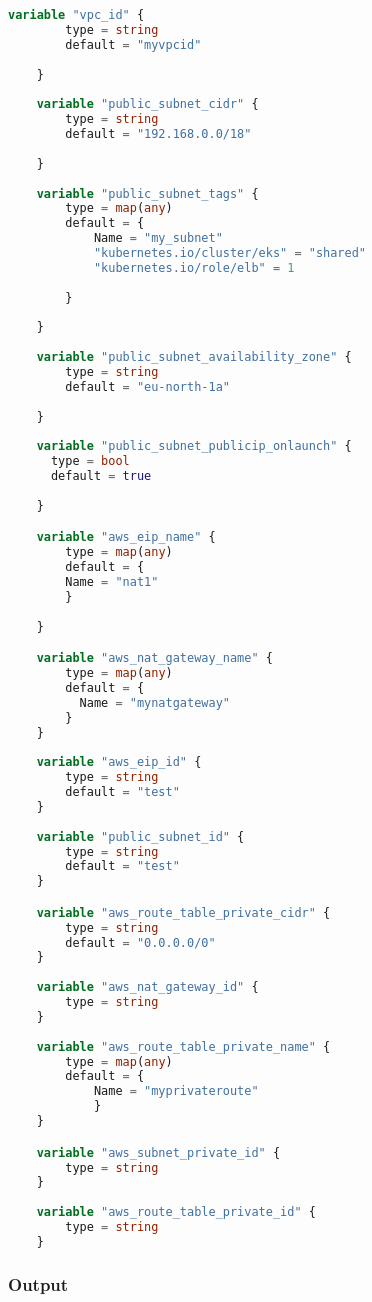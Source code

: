 \begin{lstlisting}[language=terraform]
    variable "vpc_id" {
        type = string
        default = "myvpcid"
    
    }
    
    variable "public_subnet_cidr" {
        type = string
        default = "192.168.0.0/18"
      
    }
    
    variable "public_subnet_tags" {
        type = map(any)
        default = {
            Name = "my_subnet"
            "kubernetes.io/cluster/eks" = "shared"
            "kubernetes.io/role/elb" = 1
            
        }
      
    }
    
    variable "public_subnet_availability_zone" {
        type = string
        default = "eu-north-1a"
      
    }
    
    variable "public_subnet_publicip_onlaunch" {
      type = bool
      default = true
      
    }

    variable "aws_eip_name" {
        type = map(any)
        default = {
        Name = "nat1" 
        }
    
    }

    variable "aws_nat_gateway_name" {
        type = map(any)
        default = {
          Name = "mynatgateway"
        }
    }
      
    variable "aws_eip_id" {
        type = string
        default = "test"
    }
      
    variable "public_subnet_id" {
        type = string 
        default = "test"
    }

    variable "aws_route_table_private_cidr" {
        type = string
        default = "0.0.0.0/0"
    }
    
    variable "aws_nat_gateway_id" {
        type = string
    }
    
    variable "aws_route_table_private_name" {
        type = map(any)
        default = {
            Name = "myprivateroute"
            }
    }

    variable "aws_subnet_private_id" {
        type = string
    }
    
    variable "aws_route_table_private_id" {
        type = string
    }   
\end{lstlisting}

\subsubsection{
{Output}}
\label{sec:Output}

